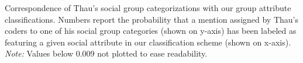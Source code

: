 Correspondence of Thau's social group categorizations with our group attribute classifications. Numbers report the probability that a mention assigned by Thau's coders to one of his social group categories (shown on y-axis) has been labeled as featuring a given social attribute in our classification scheme (shown on x-axis). \emph{Note:} Values below 0.009 not plotted to ease readability.